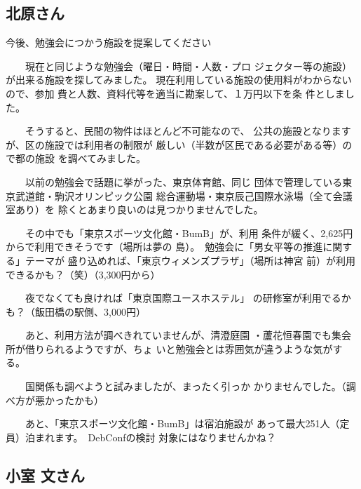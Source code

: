 \documentclass[cjk,dvipdfmx]{beamer}
\begin{document}
\subsection{北原さん}


\begin{frame}{今後、勉強会につかう施設を提案してください}
\tiny

　　現在と同じような勉強会（曜日・時間・人数・プロ
ジェクター等の施設）が出来る施設を探してみました。
現在利用している施設の使用料がわからないので、参加
費と人数、資料代等を適当に勘案して、１万円以下を条
件としました。

　　そうすると、民間の物件はほとんど不可能なので、
公共の施設となりますが、区の施設では利用者の制限が
厳しい（半数が区民である必要がある等）ので都の施設
を調べてみました。

　　以前の勉強会で話題に挙がった、東京体育館、同じ
団体で管理している東京武道館・駒沢オリンピック公園
総合運動場・東京辰己国際水泳場（全て会議室あり）を
除くとあまり良いのは見つかりませんでした。

　　その中でも「東京スポーツ文化館・BumB」が、利用
条件が緩く、2,625円からで利用できそうです（場所は夢の
島）。　勉強会に「男女平等の推進に関する」テーマが
盛り込めれば、「東京ウィメンズプラザ」（場所は神宮
前）が利用できるかも？（笑）（3,300円から）

　　夜でなくても良ければ「東京国際ユースホステル」
の研修室が利用でるかも？（飯田橋の駅側、3,000円）

　　あと、利用方法が調べきれていませんが、清澄庭園
・蘆花恒春園でも集会所が借りられるようですが、ちょ
いと勉強会とは雰囲気が違うような気がする。

　　国関係も調べようと試みましたが、まったく引っか
かりませんでした。（調べ方が悪かったかも）

　　あと、「東京スポーツ文化館・BumB」は宿泊施設が
あって最大251人（定員）泊まれます。　DebConfの検討
対象にはなりませんかね？


\end{frame}

\subsection{小室 文さん}
\end{document}

